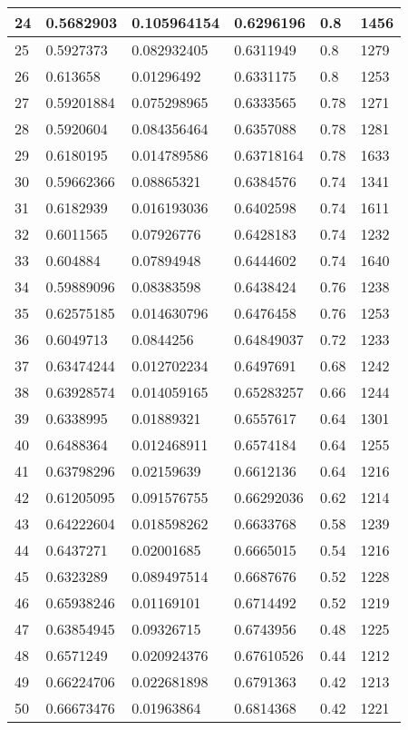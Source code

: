 \begin{longtable}{|l|l|l|l|l|l|}
24 & 0.5682903 & 0.105964154 & 0.6296196 & 0.8 & 1456 \\ \hline 
25 & 0.5927373 & 0.082932405 & 0.6311949 & 0.8 & 1279 \\ \hline 
26 & 0.613658 & 0.01296492 & 0.6331175 & 0.8 & 1253 \\ \hline 
27 & 0.59201884 & 0.075298965 & 0.6333565 & 0.78 & 1271 \\ \hline 
28 & 0.5920604 & 0.084356464 & 0.6357088 & 0.78 & 1281 \\ \hline 
29 & 0.6180195 & 0.014789586 & 0.63718164 & 0.78 & 1633 \\ \hline 
30 & 0.59662366 & 0.08865321 & 0.6384576 & 0.74 & 1341 \\ \hline 
31 & 0.6182939 & 0.016193036 & 0.6402598 & 0.74 & 1611 \\ \hline 
32 & 0.6011565 & 0.07926776 & 0.6428183 & 0.74 & 1232 \\ \hline 
33 & 0.604884 & 0.07894948 & 0.6444602 & 0.74 & 1640 \\ \hline 
34 & 0.59889096 & 0.08383598 & 0.6438424 & 0.76 & 1238 \\ \hline 
35 & 0.62575185 & 0.014630796 & 0.6476458 & 0.76 & 1253 \\ \hline 
36 & 0.6049713 & 0.0844256 & 0.64849037 & 0.72 & 1233 \\ \hline 
37 & 0.63474244 & 0.012702234 & 0.6497691 & 0.68 & 1242 \\ \hline 
38 & 0.63928574 & 0.014059165 & 0.65283257 & 0.66 & 1244 \\ \hline 
39 & 0.6338995 & 0.01889321 & 0.6557617 & 0.64 & 1301 \\ \hline 
40 & 0.6488364 & 0.012468911 & 0.6574184 & 0.64 & 1255 \\ \hline 
41 & 0.63798296 & 0.02159639 & 0.6612136 & 0.64 & 1216 \\ \hline 
42 & 0.61205095 & 0.091576755 & 0.66292036 & 0.62 & 1214 \\ \hline 
43 & 0.64222604 & 0.018598262 & 0.6633768 & 0.58 & 1239 \\ \hline 
44 & 0.6437271 & 0.02001685 & 0.6665015 & 0.54 & 1216 \\ \hline 
45 & 0.6323289 & 0.089497514 & 0.6687676 & 0.52 & 1228 \\ \hline 
46 & 0.65938246 & 0.01169101 & 0.6714492 & 0.52 & 1219 \\ \hline 
47 & 0.63854945 & 0.09326715 & 0.6743956 & 0.48 & 1225 \\ \hline 
48 & 0.6571249 & 0.020924376 & 0.67610526 & 0.44 & 1212 \\ \hline 
49 & 0.66224706 & 0.022681898 & 0.6791363 & 0.42 & 1213 \\ \hline 
50 & 0.66673476 & 0.01963864 & 0.6814368 & 0.42 & 1221 \\ \hline 
\end{longtable}